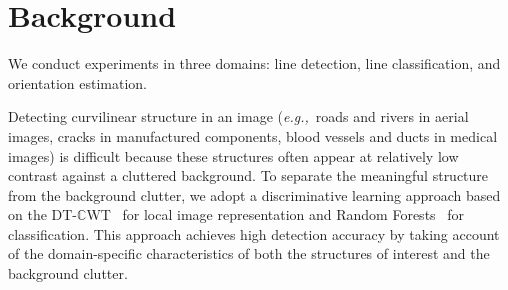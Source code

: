 \documentclass{report}
\def\eg{\emph{e.g.,}}
\def\dtcwt{DT-$\mathbb{C}$WT}
\begin{document}
%


\section{Background}
We conduct experiments in three domains: line detection, line classification, and orientation estimation.

Detecting curvilinear structure in an image (\eg~roads and rivers in aerial images, cracks in manufactured components, blood vessels and ducts in medical images) is difficult because these structures often appear at relatively low contrast against a cluttered background. To separate the meaningful structure from the background clutter, we adopt a discriminative learning approach based on the \dtcwt~\cite{Kingsbury_ACHA01} for local image representation and Random Forests~\cite{Breiman_ML01} for classification. This approach achieves high detection accuracy by taking account of the domain-specific characteristics of both the structures of interest and the background clutter.
\end{document}
